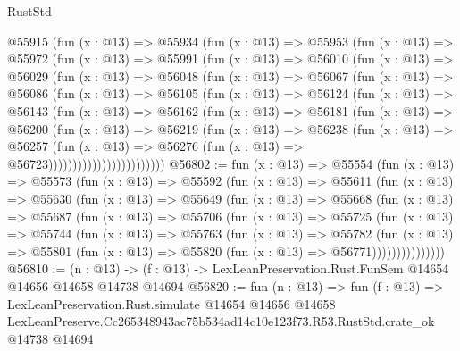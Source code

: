 \begin{lexlean}{RustStd}
\begin{coremodule}
          @55915
            (fun (x : @13) =>
            @55934
              (fun (x : @13) =>
              @55953
                (fun (x : @13) =>
                @55972
                  (fun (x : @13) =>
                  @55991
                    (fun (x : @13) =>
                    @56010
                      (fun (x : @13) =>
                      @56029
                        (fun (x : @13) =>
                        @56048
                          (fun (x : @13) =>
                          @56067
                            (fun (x : @13) =>
                            @56086
                              (fun (x : @13) =>
                              @56105
                                (fun (x : @13) =>
                                @56124
                                  (fun (x : @13) =>
                                  @56143
                                    (fun (x : @13) =>
                                    @56162
                                      (fun (x : @13) =>
                                      @56181
                                        (fun (x : @13) =>
                                        @56200
                                          (fun (x : @13) =>
                                          @56219
                                            (fun (x : @13) =>
                                            @56238
                                              (fun (x : @13) =>
                                              @56257
                                                (fun (x : @13) =>
                                                @56276
                                                  (fun (x : @13) => @56723))))))))))))))))))))))))
@56802 := fun (x : @13) =>
  @55554
    (fun (x : @13) =>
    @55573
      (fun (x : @13) =>
      @55592
        (fun (x : @13) =>
        @55611
          (fun (x : @13) =>
          @55630
            (fun (x : @13) =>
            @55649
              (fun (x : @13) =>
              @55668
                (fun (x : @13) =>
                @55687
                  (fun (x : @13) =>
                  @55706
                    (fun (x : @13) =>
                    @55725
                      (fun (x : @13) =>
                      @55744
                        (fun (x : @13) =>
                        @55763
                          (fun (x : @13) =>
                          @55782
                            (fun (x : @13) =>
                            @55801 (fun (x : @13) => @55820 (fun (x : @13) => @56771)))))))))))))))
@56810 := (n : @13) ->
  (f : @13) -> LexLeanPreservation.Rust.FunSem @14654 @14656 @14658 @14738 @14694
@56820 := fun (n : @13) =>
  fun (f : @13) =>
  LexLeanPreservation.Rust.simulate
    @14654
    @14656
    @14658
    LexLeanPreserve.Cc265348943ac75b534ad14c10e123f73.R53.RustStd.crate_ok
    @14738
    @14694
\end{coremodule}
\end{lexlean}
